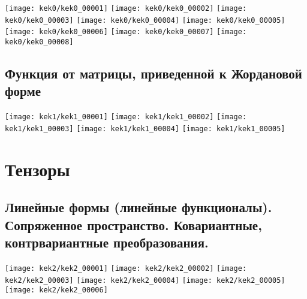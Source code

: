 \documentclass[../main.tex]{subfiles}
\begin{document}
	\texttt{[image: kek0/kek0\_00001]}
	\texttt{[image: kek0/kek0\_00002]}
	\texttt{[image: kek0/kek0\_00003]}
	\texttt{[image: kek0/kek0\_00004]}
	\texttt{[image: kek0/kek0\_00005]}
	\texttt{[image: kek0/kek0\_00006]}
	\texttt{[image: kek0/kek0\_00007]}
	\texttt{[image: kek0/kek0\_00008]}
	\subsection{Функция от матрицы, приведенной к Жордановой форме}
	\texttt{[image: kek1/kek1\_00001]}
	\texttt{[image: kek1/kek1\_00002]}
	\texttt{[image: kek1/kek1\_00003]}\n
	\texttt{[image: kek1/kek1\_00004]}\n
	\texttt{[image: kek1/kek1\_00005]}
	\section{Тензоры}
	\subsection{Линейные формы (линейные функционалы). Сопряженное пространство. Ковариантные, 
	контрвариантные преобразования.}
	\texttt{[image: kek2/kek2\_00001]}\n
	\texttt{[image: kek2/kek2\_00002]}
	\texttt{[image: kek2/kek2\_00003]}\n
	\texttt{[image: kek2/kek2\_00004]}\n
	\texttt{[image: kek2/kek2\_00005]}\n
	\texttt{[image: kek2/kek2\_00006]}
\end{document}
